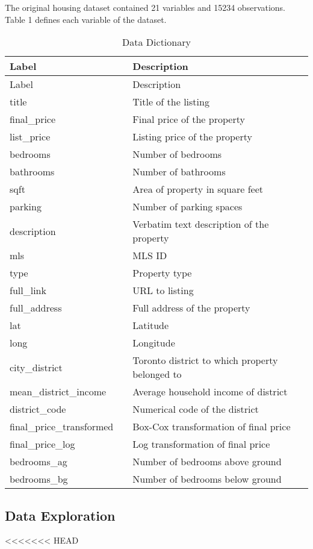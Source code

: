 \documentclass[11pt,]{article}
\begin{document}
The original housing dataset contained 21 variables and 15234
observations. Table 1 defines each variable of the dataset.

\begin{longtable}[]{@{}lll@{}}
\caption{Data Dictionary}\tabularnewline
\toprule
Label & & Description\tabularnewline
\midrule
\endfirsthead
\toprule
Label & & Description\tabularnewline
\midrule
\endhead
title & & Title of the listing\tabularnewline
final\_price & & Final price of the property\tabularnewline
list\_price & & Listing price of the property\tabularnewline
bedrooms & & Number of bedrooms\tabularnewline
bathrooms & & Number of bathrooms\tabularnewline
sqft & & Area of property in square feet\tabularnewline
parking & & Number of parking spaces\tabularnewline
description & & Verbatim text description of the property\tabularnewline
mls & & MLS ID\tabularnewline
type & & Property type\tabularnewline
full\_link & & URL to listing\tabularnewline
full\_address & & Full address of the property\tabularnewline
lat & & Latitude\tabularnewline
long & & Longitude\tabularnewline
city\_district & & Toronto district to which property belonged
to\tabularnewline
mean\_district\_income & & Average household income of
district\tabularnewline
district\_code & & Numerical code of the district\tabularnewline
final\_price\_transformed & & Box-Cox transformation of final
price\tabularnewline
final\_price\_log & & Log transformation of final price\tabularnewline
bedrooms\_ag & & Number of bedrooms above ground\tabularnewline
bedrooms\_bg & & Number of bedrooms below ground\tabularnewline
\bottomrule
\end{longtable}

\hypertarget{data-exploration}{%
\subsection{Data Exploration}\label{data-exploration}}

<<<<<<< HEAD
\begin{Shaded}
\begin{Highlighting}[]
\StringTok{ }\NormalTok{(}\NormalTok{)}
\StringTok{ }\NormalTok{(}\NormalTok{, }\NormalTok{, }\NormalTok{, }\NormalTok{, }\NormalTok{, }\NormalTok{, }\NormalTok{, }\NormalTok{, }\NormalTok{, }\NormalTok{)}
\StringTok{ }\NormalTok{(}\NormalTok{, }\NormalTok{, }\NormalTok{, }\NormalTok{, }\NormalTok{, }\NormalTok{, }\NormalTok{, }\NormalTok{)}
\end{Highlighting}
\end{Shaded}
\end{document}
